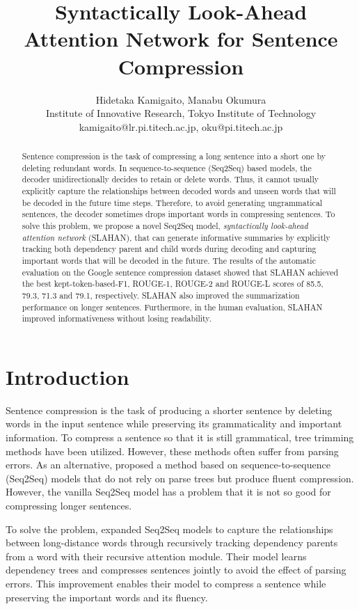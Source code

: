 \documentclass[letterpaper]{article} \usepackage{aaai20}  \usepackage{times}  \usepackage{helvet} \usepackage{courier}  \usepackage[hyphens]{url}  \usepackage{graphicx} \urlstyle{rm} \def\UrlFont{\rm}  \usepackage{graphicx}  \frenchspacing  \setlength{\pdfpagewidth}{8.5in}  \setlength{\pdfpageheight}{11in}  \usepackage{tabu}
\title{Syntactically Look-Ahead Attention Network for Sentence Compression}
\author{
    Hidetaka Kamigaito, Manabu Okumura\\
    Institute of Innovative Research, Tokyo Institute of Technology\\
 kamigaito@lr.pi.titech.ac.jp, oku@pi.titech.ac.jp
}
\newcommand{\newcite}[1]{\citeauthor{#1} \shortcite{#1}}
\begin{document}
\maketitle

\begin{abstract}
Sentence compression is the task of compressing a long sentence into a short one by deleting redundant words.
In sequence-to-sequence (Seq2Seq) based models, the decoder unidirectionally decides to retain or delete words.
Thus, it cannot usually explicitly capture the relationships between decoded words and unseen words that will be decoded in the future time steps.
Therefore, to avoid generating ungrammatical sentences, the decoder sometimes drops important words in compressing sentences. 
To solve this problem, we propose a novel Seq2Seq model, \textit{syntactically look-ahead attention network} (SLAHAN), that can generate informative summaries by explicitly tracking both dependency parent and child words during decoding and capturing important words that will be decoded in the future.
The results of the automatic evaluation on the Google sentence compression
dataset showed that SLAHAN achieved the best kept-token-based-F1, ROUGE-1, ROUGE-2 and ROUGE-L scores of 85.5, 79.3, 71.3 and 79.1, respectively.
SLAHAN also improved the summarization performance on longer sentences.
Furthermore, in the human evaluation, SLAHAN improved informativeness without losing readability.
\end{abstract}

\section{Introduction}

Sentence compression is the task of producing a shorter sentence by deleting words in the input sentence while preserving its grammaticality and important information. To compress a sentence so that it is still grammatical, tree trimming methods \cite{jing:2000:ANLP,knight2000statistics,bergkirkpatrick-gillick-klein:2011:ACL-HLT2011,filippova-altun:2013:EMNLP} have been utilized. However, these methods often suffer from parsing errors.
As an alternative, \newcite{filippova-EtAl:2015:EMNLP} proposed a method based on sequence-to-sequence (Seq2Seq) models that do not rely on parse trees but produce fluent compression. However, the vanilla Seq2Seq model has a problem that it is not so good for compressing longer sentences.

To solve the problem, \newcite{kamigaito-etal-2018-higher} expanded Seq2Seq models to capture the relationships between long-distance
words through recursively tracking dependency parents from a word with their recursive attention module.
Their model learns dependency trees and compresses sentences jointly to avoid the effect of parsing errors.
This improvement enables their model to compress a sentence while preserving the important words and its fluency.
\end{document}
